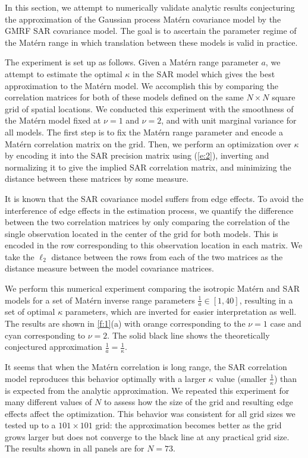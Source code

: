 \documentclass[review]{elsarticle}
\begin{document}
In this section, we attempt to numerically validate analytic results conjecturing the approximation of the Gaussian process Mat\'ern covariance model by the GMRF SAR covariance model. The goal is to ascertain the parameter regime of the Mat\'ern range in which translation between these models is valid in practice. 

The experiment is set up as follows. Given a Mat\'ern range parameter $a$, we attempt to estimate the optimal $\kappa$ in the SAR model which gives the best approximation to the Mat\'ern model. We accomplish this by comparing the correlation matrices for both of these models defined on the same $N \times N$ square grid of spatial locations. We conducted this experiment with the smoothness of the Mat\'ern model fixed at $\nu=1$ and $\nu=2$, and with unit marginal variance for all models. The first step is to fix the Mat\'ern range parameter and encode a Mat\'ern correlation matrix on the grid. Then, we perform an optimization over $\kappa$ by encoding it into the SAR precision matrix using (\ref{e:2}), inverting and normalizing it to give the implied SAR correlation matrix, and minimizing the distance between these matrices by some measure.

It is known that the SAR covariance model suffers from edge effects. To avoid the interference of edge effects in the estimation process, we quantify the difference between the two correlation matrices by only comparing the correlation of the single observation located in the center of the grid for both models. This is encoded in the row corresponding to this observation location in each matrix. We take the $\ell_2$ distance between the rows from each of the two matrices as the distance measure between the model covariance matrices.

We perform this numerical experiment comparing the isotropic Mat\'ern and SAR models for a set of Mat\'ern inverse range parameters $\frac{1}{a} \in [1, 40]$, resulting in a set of optimal $\kappa$ parameters, which are inverted for easier interpretation as well. The results are shown in \ref{f:1}(a) with orange corresponding to the $\nu=1$ case and cyan corresponding to $\nu=2$. The solid black line shows the theoretically conjectured approximation $\frac{1}{a} = \frac{1}{\kappa}$. 



It seems that when the Mat\'ern correlation is long range, the SAR correlation model reproduces this behavior optimally with a larger $\kappa$ value (smaller $\frac{1}{\kappa}$) than is expected from the analytic approximation. We repeated this experiment for many different values of $N$ to assess how the size of the grid and resulting edge effects affect the optimization. This behavior was consistent for all grid sizes we tested up to a $101\times 101$ grid: the approximation becomes better as the grid grows larger but does not converge to the black line at any practical grid size. The results shown in all panels are for $N=73$.
\end{document}
